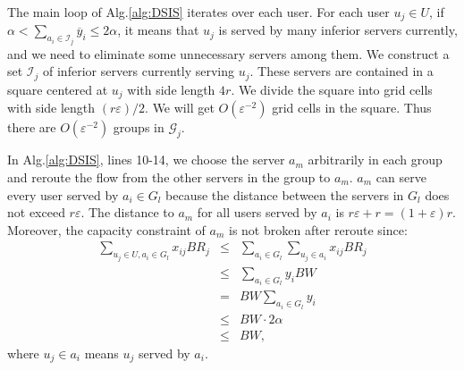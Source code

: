 \documentclass[journal]{IEEEtran}
\begin{document}
The main loop of Alg.\ref{alg:DSIS} iterates over each user. For each user $u_j\in U$, if $\alpha < \sum\nolimits_{{a_i} \in \mathcal{I}_j} {{{\overline y }_i}}  \le 2\alpha $, it means that $u_j$ is served by many inferior servers currently, and we need to eliminate some unnecessary servers among them. We construct a set $\mathcal{I}_j$ of inferior servers currently serving $u_j$. These servers are contained in a square centered at $u_j$ with side length $4r$. We divide the square into grid cells with side length $(r\varepsilon)/2$. We will get $O(\varepsilon^{-2})$ grid cells in the square. Thus there are $O(\varepsilon^{-2})$ groups in $\mathcal{G}_j$.


In Alg.\ref{alg:DSIS}, lines 10-14, we choose the server $a_m$ arbitrarily in each group and reroute the flow from the other servers in the group to $a_m$. $a_m$ can serve every user served by $a_i \in G_l $ because the distance between the servers in $G_l$ does not exceed $r\varepsilon$. The distance to $a_m$ for all users served by $a_i$ is $r\varepsilon + r = (1+\varepsilon)r $. Moreover, the capacity constraint of $a_m$ is not broken after reroute since:
\begin{eqnarray*}
	\sum\limits_{u_j \in U, a_i \in G_l} {x_{ij}BR_j} &\le&\sum\limits_{a_i\in G_l} {\sum\limits_{u_j \in a_i} {x_{ij}BR_j}}\\
	&\le&\sum\limits_{a_i\in G_l} {y_i BW}\\
	&=&BW\sum\limits_{a_i\in G_l} {y_i} \\
	&\le&BW \cdot 2 \alpha\\
	&\le&BW,
\end{eqnarray*}
where $u_j\in a_i$ means $u_j$ served by $a_i$.
\end{document}
